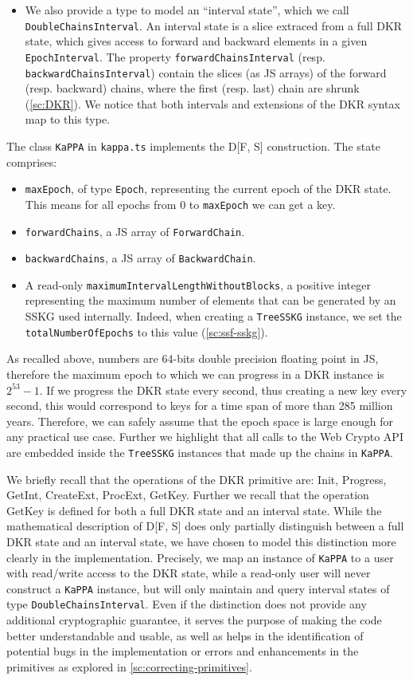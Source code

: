 \begin{itemize}
    \item We also provide a type to model an ``interval state'', which we call \texttt{DoubleChainsInterval}. An interval state is a slice extraced from a full DKR state, which gives access to forward and backward elements in a given \texttt{EpochInterval}. The property \texttt{forwardChainsInterval} (resp. \texttt{backwardChainsInterval}) contain the slices (as JS arrays) of the forward (resp. backward) chains, where the first (resp. last) chain are shrunk (\cref{sc:DKR}). We notice that both intervals and extensions of the DKR syntax map to this type.
\end{itemize}
The class \texttt{KaPPA} in {\texttt{kappa.ts}} implements the
D[F, S] construction. The state comprises:
\begin{itemize}
    \item \texttt{maxEpoch}, of type \texttt{Epoch}, representing the current epoch of the DKR state. This means for all epochs from 0 to \texttt{maxEpoch} we can get a key.
    \item \texttt{forwardChains}, a JS array of \texttt{ForwardChain}.
    \item \texttt{backwardChains}, a JS array of \texttt{BackwardChain}.
    \item A read-only \texttt{maximumIntervalLengthWithoutBlocks}, a positive integer representing the maximum number of elements that can be generated by an SSKG used internally.
    Indeed, when creating a \texttt{TreeSSKG} instance, we set the \texttt{totalNumberOfEpochs} to this value (\cref{sc:ssf-sskg}).
\end{itemize}

As recalled above, numbers are 64-bits double precision floating point in JS,
therefore the maximum epoch to which we can progress in a DKR instance is $2^{53} - 1$.
If we progress the DKR state every second, thus creating a new key
every second, this would correspond to keys for
a time span of more than 285 million years. 
Therefore, we can safely
assume that the epoch space is large enough for any practical use case.
Further we highlight that all calls to the Web Crypto API are embedded 
inside the \texttt{TreeSSKG} instances that made up the chains in \texttt{KaPPA}. 

We briefly recall that the operations of the DKR primitive are:
Init, Progress, GetInt, CreateExt, ProcExt, GetKey. Further we recall
that the operation GetKey is defined for both a full DKR state and
an interval state.
While the mathematical
description of D[F, S] does only partially distinguish between
a full DKR state and an interval state, we have chosen to model
this distinction more clearly in the implementation.
Precisely, we map an instance of \texttt{KaPPA} to a user with
read/write access to the DKR state, while a read-only
user will never construct a \texttt{KaPPA} instance, but will
only maintain and query interval states of type
\texttt{DoubleChainsInterval}. Even if the distinction does not
provide any additional cryptographic guarantee, it serves the purpose of
making the code better understandable and usable, as well
as helps in the identification of potential bugs in the implementation
or errors and enhancements in the primitives as explored in \cref{sc:correcting-primitives}.

